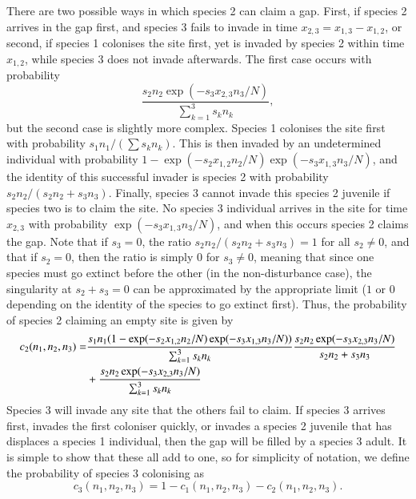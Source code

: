 There are two possible ways in which species 2 can claim a gap. First, if species 2 arrives in the gap first, and species 3 fails to invade in time $x_{2,3}=x_{1,3}-x_{1,2}$, or second, if species 1 colonises the site first, yet is invaded by species 2 within time $x_{1,2}$, while species 3 does not invade afterwards. The first case occurs with probability
$$
\frac{s_2 n_2\exp(-s_3x_{2,3}n_3/N)}{\sum_{k=1}^3 s_k n_k},
$$
but the second case is slightly more complex. Species 1 colonises the site first with probability $s_1n_1/(\sum s_kn_k)$. This is then invaded by an undetermined individual with probability $1-\exp(-s_2x_{1,2}n_2/N)\exp(-s_3x_{1,3}n_3/N)$, and the identity of this successful invader is species 2 with probability $s_2n_2/(s_2n_2+s_3n_3)$. Finally, species 3 cannot invade this species 2 juvenile if species two is to claim the site. No species 3 individual arrives in the site for time $x_{2,3}$ with probability $\exp(-s_3x_{1,3}n_3/N)$, and when this occurs species 2 claims the gap. Note that if $s_3=0$, the ratio $s_2n_2/(s_2n_2+s_3n_3)=1$ for all $s_2 \neq 0$, and that if $s_2=0$, then the ratio is simply $0$ for $s_3 \neq0$, meaning that since one species must go extinct before the other (in the non-disturbance case), the singularity at $s_2+s_3=0$ can be approximated by the appropriate limit ($1$ or $0$ depending on the identity of the species to go extinct first). Thus, the probability of species 2 claiming an empty site is given by
\begin{align}
\label{c2}
c_2(n_1,n_2,n_3)=&\frac{s_1 n_1(1-\exp(-s_2x_{1,2}n_2/N)\exp(-s_3x_{1,3}n_3/N))}{\sum_{k=1}^3 s_k n_k}\frac{s_2 n_2\exp(-s_3x_{2,3}n_3/N)}{s_2n_2+s_3n_3} \notag \\
&+\frac{s_2 n_2\exp(-s_3x_{2,3}n_3/N)}{\sum_{k=1}^3 s_k n_k}
\end{align}
Species 3 will invade any site that the others fail to claim. If species 3 arrives first, invades the first coloniser quickly, or invades a species 2 juvenile that has displaces a species 1 individual, then the gap will be filled by a species 3 adult. It is simple to show that these all add to one, so for simplicity of notation, we define the probability of species 3 colonising as
\begin{equation}
\label{c3}
c_3(n_1,n_2,n_3)=1-c_1(n_1,n_2,n_3)-c_2(n_1,n_2,n_3).\end{equation}

